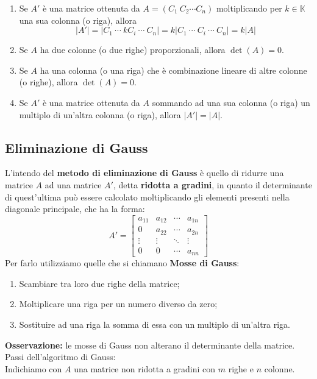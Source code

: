 \documentclass{article}
\begin{document}
\begin{enumerate}
    \item Se $A'$ è una matrice ottenuta da $A= (C_1 \ C_2 \cdots C_n)$ moltiplicando per $k\in\mathbb K$ una sua colonna (o riga), allora
          \[
              |A'|=|C_1\ \cdots\ kC_i\ \cdots\ C_n|=k|C_1\ \cdots\ C_i\ \cdots\ C_n|=k|A|
          \]
    \item Se $A$ ha due colonne (o due righe) proporzionali, allora $\det(A) = 0$.
    \item Se $A$ ha una colonna (o una riga) che è combinazione lineare di altre colonne (o righe), allora $\det(A) = 0$.
    \item Se $A'$ è una matrice ottenuta da $A$ sommando ad una sua colonna (o riga) un multiplo di un'altra colonna (o riga), allora $|A'| = |A|$.
\end{enumerate}

\subsection{Eliminazione di Gauss}
L'intendo del \textbf{metodo di eliminazione di Gauss} è quello di ridurre una matrice $A$ ad una matrice $A'$, detta \textbf{ridotta a gradini}, in quanto il determinante di quest'ultima può essere calcolato moltiplicando gli elementi presenti nella diagonale principale, che ha la forma:
\[
    A' = \begin{bmatrix}
        a_{11} & a_{12} & \cdots & a_{1n} \\
        0      & a_{22} & \cdots & a_{2n} \\
        \vdots & \vdots & \ddots & \vdots \\
        0      & 0      & \cdots & a_{nn}
    \end{bmatrix}
\]
Per farlo utilizziamo quelle che si chiamano \textbf{Mosse di Gauss}:
\begin{enumerate}
    \item Scambiare tra loro due righe della matrice;
    \item Moltiplicare una riga per un numero diverso da zero;
    \item Sostituire ad una riga la somma di essa con un multiplo di un'altra riga.
\end{enumerate}
\textbf{Osservazione:} le mosse di Gauss non alterano il determinante della matrice.\\
Passi dell'algoritmo di Gauss:\\
Indichiamo con $A$ una matrice non ridotta a gradini con $m$ righe e $n$ colonne.
\end{document}
